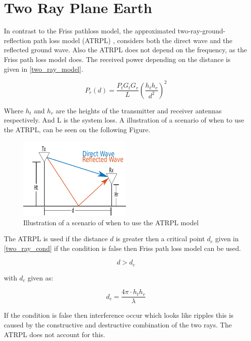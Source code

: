 \chapter{Two Ray Plane Earth}
In contrast to the Friss pathloss model, the approximated two-ray-ground-reflection path loss model (ATRPL) \citep{two_ray}, considers both the direct wave and the reflected ground wave. Also the ATRPL does not depend on the frequency, as the Friss path loss model does. The received power depending on the distance is given in \eqref{two_ray_model}.

\begin{equation}
P_r(d) = \frac{P_t G_t G_r}{L} \left(\frac{h_t h_r}{d^2}\right)^2
\label{two_ray_model}
\end{equation}

Where $h_t$ and $h_r$ are the heights of the transmitter and receiver antennas respectively. And L is the system loss. A illustration of a scenario of when to use the ATRPL, can be seen on the following Figure.

\begin{figure}[H]
\centering
\includegraphics[width=0.5\textwidth]{Figures/two_ray_illu.pdf}
\caption{Illustration of a scenario of when to use the ATRPL model}
\label{two_ray_scena}
\end{figure}


The ATRPL is used if the distance $d$ is greater then a critical point $d_{c}$ given in \eqref{two_ray_cond} if the condition is false then Friss path loss model can be used. 

\begin{equation}
d>d_{c}
\label{two_ray_cond}
\end{equation}

with $d_{c}$ given as:

\begin{equation}
d_{c} = \frac{4\pi \cdot h_t h_r}{\lambda}
\label{critical_fac_dc}
\end{equation}

If the condition is false then interference occur which looks like ripples this is caused by the constructive and destructive combination of the two rays. The ATRPL does not account for this.  

